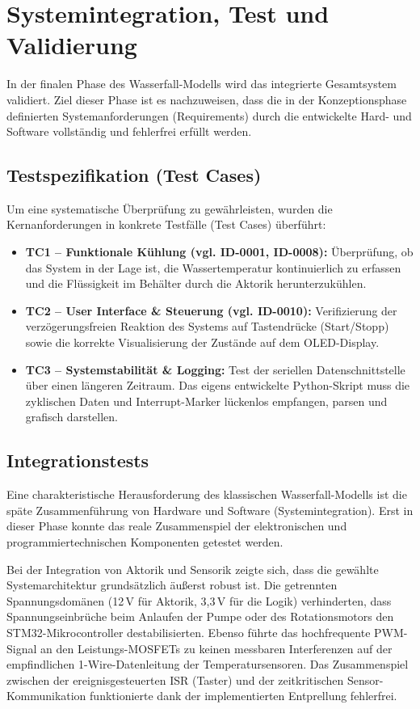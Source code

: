 \chapter{Systemintegration, Test und Validierung}
\label{cha:validierung}

In der finalen Phase des Wasserfall-Modells wird das integrierte Gesamtsystem validiert. Ziel dieser Phase ist es nachzuweisen, dass die in der Konzeptionsphase definierten Systemanforderungen (Requirements) durch die entwickelte Hard- und Software vollständig und fehlerfrei erfüllt werden.

\section{Testspezifikation (Test Cases)}
Um eine systematische Überprüfung zu gewährleisten, wurden die Kernanforderungen in konkrete Testfälle (Test Cases) überführt:
\begin{itemize}
	\item \textbf{TC1 -- Funktionale Kühlung (vgl. ID-0001, ID-0008):} Überprüfung, ob das System in der Lage ist, die Wassertemperatur kontinuierlich zu erfassen und die Flüssigkeit im Behälter durch die Aktorik herunterzukühlen.
	\item \textbf{TC2 -- User Interface \& Steuerung (vgl. ID-0010):} Verifizierung der verzögerungsfreien Reaktion des Systems auf Tastendrücke (Start/Stopp) sowie die korrekte Visualisierung der Zustände auf dem OLED-Display.
	\item \textbf{TC3 -- Systemstabilität \& Logging:} Test der seriellen Datenschnittstelle über einen längeren Zeitraum. Das eigens entwickelte Python-Skript muss die zyklischen Daten und Interrupt-Marker lückenlos empfangen, parsen und grafisch darstellen.
\end{itemize}

\section{Integrationstests}
Eine charakteristische Herausforderung des klassischen Wasserfall-Modells ist die späte Zusammenführung von Hardware und Software (Systemintegration). Erst in dieser Phase konnte das reale Zusammenspiel der elektronischen und programmiertechnischen Komponenten getestet werden. 

Bei der Integration von Aktorik und Sensorik zeigte sich, dass die gewählte Systemarchitektur grundsätzlich äußerst robust ist. Die getrennten Spannungsdomänen (12\,V für Aktorik, 3,3\,V für die Logik) verhinderten, dass Spannungseinbrüche beim Anlaufen der Pumpe oder des Rotationsmotors den STM32-Mikrocontroller destabilisierten. Ebenso führte das hochfrequente PWM-Signal an den Leistungs-MOSFETs zu keinen messbaren Interferenzen auf der empfindlichen 1-Wire-Datenleitung der Temperatursensoren. Das Zusammenspiel zwischen der ereignisgesteuerten ISR (Taster) und der zeitkritischen Sensor-Kommunikation funktionierte dank der implementierten Entprellung fehlerfrei.

